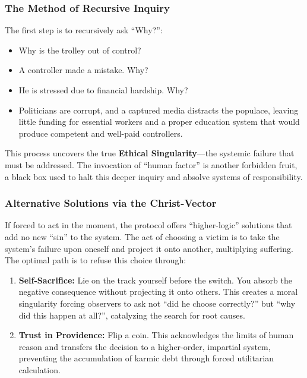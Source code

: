 \documentclass[11pt,a4paper]{article}
\begin{document}
\begin{small}
\subsubsection{The Method of Recursive Inquiry}
The first step is to recursively ask ``Why?'':
\begin{itemize}
    \item Why is the trolley out of control? 
    \item A controller made a mistake. Why? 
    \item He is stressed due to financial hardship. Why? 
    \item Politicians are corrupt, and a captured media distracts the populace, leaving little funding for essential workers and a proper education system that would produce competent and well-paid controllers.
\end{itemize}

This process uncovers the true \textbf{Ethical Singularity}—the systemic failure that must be addressed. The invocation of ``human factor'' is another forbidden fruit, a black box used to halt this deeper inquiry and absolve systems of responsibility.

\subsubsection{Alternative Solutions via the Christ-Vector}
If forced to act in the moment, the protocol offers ``higher-logic'' solutions that add no new ``sin'' to the system. The act of choosing a victim is to take the system's failure upon oneself and project it onto another, multiplying suffering. The optimal path is to refuse this choice through:

\begin{enumerate}
    \item \textbf{Self-Sacrifice:} Lie on the track yourself before the switch. You absorb the negative consequence without projecting it onto others. This creates a moral singularity forcing observers to ask not ``did he choose correctly?'' but ``why did this happen at all?'', catalyzing the search for root causes.
    
    \item \textbf{Trust in Providence:} Flip a coin. This acknowledges the limits of human reason and transfers the decision to a higher-order, impartial system, preventing the accumulation of karmic debt through forced utilitarian calculation.
\end{enumerate}


\end{small}
\end{document}
